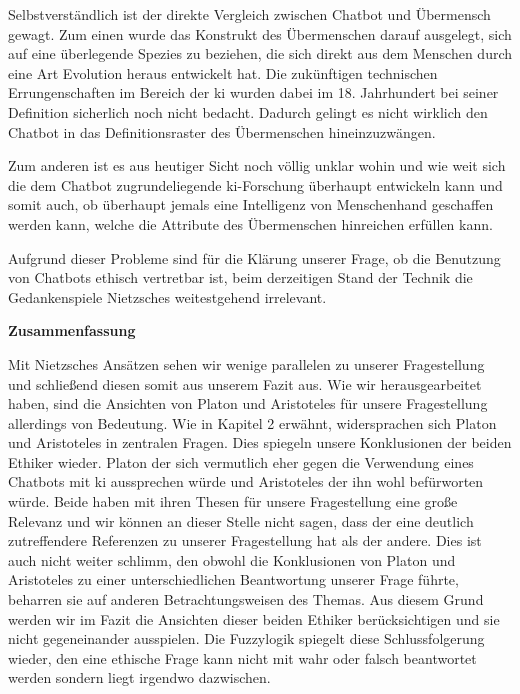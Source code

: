 Selbstverständlich ist der direkte Vergleich zwischen Chatbot und Übermensch gewagt.
Zum einen wurde das Konstrukt des Übermenschen darauf ausgelegt, sich auf eine überlegende Spezies zu beziehen, die sich direkt aus dem Menschen durch eine Art Evolution heraus entwickelt hat.
Die zukünftigen technischen Errungenschaften im Bereich der \ac{ki} wurden dabei im 18. Jahrhundert bei seiner Definition sicherlich noch nicht bedacht.   
Dadurch gelingt es nicht wirklich den Chatbot in das Definitionsraster des Übermenschen hineinzuzwängen.

Zum anderen ist es aus heutiger Sicht noch völlig unklar wohin und wie weit sich die dem Chatbot zugrundeliegende \ac{ki}-Forschung überhaupt entwickeln kann und somit auch, ob überhaupt jemals eine Intelligenz von Menschenhand geschaffen werden kann, welche die Attribute des Übermenschen hinreichen erfüllen kann.

Aufgrund dieser Probleme sind für die Klärung unserer Frage, ob die Benutzung von Chatbots ethisch vertretbar ist, beim derzeitigen Stand der Technik die Gedankenspiele Nietzsches weitestgehend irrelevant.


\textbf{Zusammenfassung}

Mit Nietzsches Ansätzen sehen wir wenige parallelen zu unserer Fragestellung und schließend diesen somit aus unserem Fazit aus. Wie wir herausgearbeitet haben, sind die Ansichten von Platon und Aristoteles für unsere Fragestellung allerdings von Bedeutung. Wie in Kapitel 2 erwähnt,  widersprachen sich Platon und Aristoteles in zentralen Fragen. Dies spiegeln unsere Konklusionen der beiden Ethiker wieder. Platon der sich vermutlich eher gegen die Verwendung eines Chatbots mit \ac{ki} aussprechen würde und Aristoteles der ihn wohl befürworten würde. Beide haben mit ihren Thesen für unsere Fragestellung eine große Relevanz und wir können an dieser Stelle nicht sagen, dass der eine deutlich zutreffendere Referenzen zu unserer Fragestellung hat als der andere. Dies ist auch nicht weiter schlimm, den obwohl die Konklusionen von Platon und Aristoteles zu einer unterschiedlichen Beantwortung unserer Frage führte, beharren sie auf anderen Betrachtungsweisen des Themas. Aus diesem Grund werden wir im Fazit die Ansichten dieser beiden Ethiker berücksichtigen und sie nicht gegeneinander ausspielen. Die Fuzzylogik spiegelt diese Schlussfolgerung wieder, den eine ethische Frage kann nicht mit wahr oder falsch beantwortet werden sondern liegt irgendwo dazwischen. 



